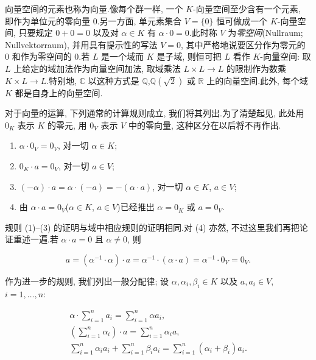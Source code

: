 向量空间的元素也称为向量.像每个群一样, 一个 $K$-向量空间至少含有一个元素, 即作为单位元的零向量 $0$.另一方面, 单元素集合 $V = \{0\}$ 恒可做成一个 $K$-向量空间, 只要规定 $0 + 0 = 0$ 以及对 $\alpha \in K$ 有 $\alpha \cdot 0 = 0$.此时称 $V$ 为\emph{零空间}(\textup{Nullraum; Nullvektorraum}), 并用具有提示性的写法 $V = 0$, 其中严格地说要区分作为零元的 $0$ 和作为零空间的 $0$.若 $L$ 是一个域而 $K$ 是子域, 则恒可把 $L$ 看作 $K$-向量空间: 取 $L$ 上给定的域加法作为向量空间加法, 取域乘法 $L \times L \longrightarrow L$ 的限制作为数乘 $K \times L \longrightarrow L$.特别地, $\mathbb{C}$ 以这种方式是 $\mathbb{Q}$,$\mathbb{Q}(\sqrt{2})$ 或 $\mathbb{R}$ 上的向量空间.此外, 每个域 $K$ 都是自身上的向量空间.

对于向量的运算, 下列通常的计算规则成立, 我们将其列出.为了清楚起见, 此处用 $0_K$ 表示 $K$ 的零元, 用 $0_V$ 表示 $V$ 中的零向量, 这种区分在以后将不再作出.

\begin{enumerate}
\item[(1)] $\alpha \cdot 0_V = 0_V$, 对一切 $\alpha \in K$;
\item[(2)] $0_K \cdot a = 0_V$, 对一切 $a \in V$;
\item[(3)] $(-\alpha) \cdot a = \alpha \cdot (-a) = -(\alpha \cdot a)$, 对一切 $\alpha \in K$, $a \in V$;
\item[(4)] 由 $\alpha \cdot a = 0_V$($\alpha \in K$, $a \in V$)已经推出 $\alpha = 0_K$ 或 $a = 0_V$.
\end{enumerate}

规则 (1)--(3) 的证明与域中相应规则的证明相同.对 (4) 亦然, 不过这里我们再把论证重述一遍.若 $\alpha \cdot a = 0$ 且 $\alpha \neq 0$, 则

\[
a = (\alpha^{-1} \cdot \alpha) \cdot a = \alpha^{-1} \cdot (\alpha \cdot a) = \alpha^{-1} \cdot 0_V = 0_V\text{.}
\]

作为进一步的规则, 我们列出一般分配律; 设 $\alpha, \alpha_i, \beta_i \in K$ 以及 $a, a_i \in V$, $i = 1, \ldots, n$:

\[
\begin{array}{c}
\alpha \cdot \sum_{i = 1}^{n} a_i = \sum_{i = 1}^{n} \alpha a_i, \\
\left(\sum_{i = 1}^{n} \alpha_i\right) \cdot a = \sum_{i = 1}^{n} \alpha_i a, \\
\sum_{i = 1}^{n} \alpha_i a_i + \sum_{i = 1}^{n} \beta_i a_i = \sum_{i = 1}^{n} (\alpha_i + \beta_i) a_i\text{.}
\end{array}
\]

